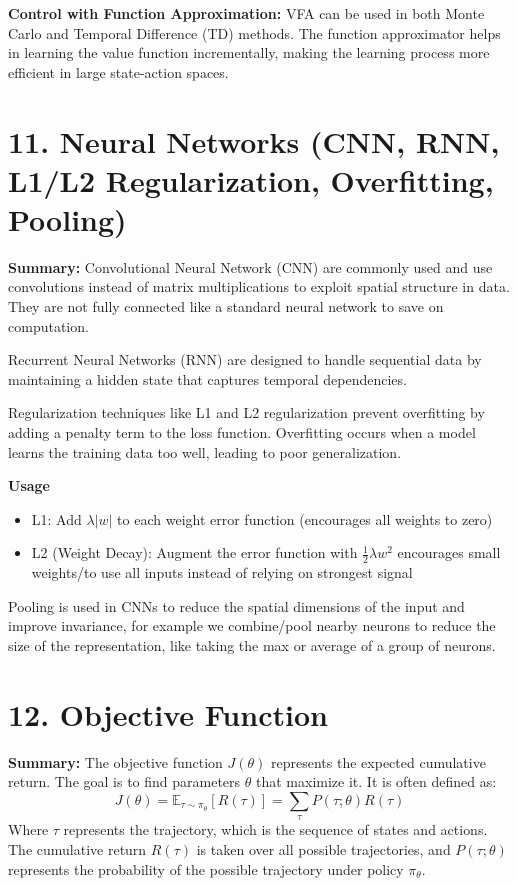 \documentclass[a4paper,10pt]{article}
\begin{document}
\begin{multicols}{2}
\noindent \textbf{Control with Function Approximation:} VFA can be used in both Monte Carlo and Temporal Difference (TD) methods. The function approximator helps in learning the value function incrementally, making the learning process more efficient in large state-action spaces.


\section*{11. Neural Networks (CNN, RNN, L1/L2 Regularization, Overfitting, Pooling)}
\textbf{Summary:} Convolutional Neural Network (CNN) are commonly used and use convolutions instead of matrix multiplications to exploit spatial structure in data. They are not fully connected like a standard neural network to save on computation.

Recurrent Neural Networks (RNN) are designed to handle sequential data by maintaining a hidden state that captures temporal dependencies.

Regularization techniques like L1 and L2 regularization prevent overfitting by adding a penalty term to the loss function. Overfitting occurs when a model learns the training data too well, leading to poor generalization.

\noindent \textbf{Usage}
\begin{itemize}
    \item L1: Add \( \lambda |w| \) to each weight error function (encourages all weights to zero)
    \item L2 (Weight Decay): Augment the error function with \( \frac{1}{2} \lambda w^2 \) encourages small weights/to use all inputs instead of relying on strongest signal
\end{itemize}
Pooling is used in CNNs to reduce the spatial dimensions of the input and improve invariance, for example we combine/pool nearby neurons to reduce the size of the representation, like taking the max or average of a group of neurons.

\section*{12. Objective Function}
\textbf{Summary:} The objective function \( J(\theta) \) represents the expected cumulative return. The goal is to find parameters \( \theta \) that maximize it. It is often defined as:
\[
J(\theta) = \mathbb{E}_{\tau \sim \pi_\theta} [R(\tau)] = \sum_{\tau} P(\tau;\theta)R(\tau)
\]
Where \( \tau \) represents the trajectory, which is the sequence of states and actions. The cumulative return \( R(\tau) \) is taken over all possible trajectories, and \( P(\tau;\theta) \) represents the probability of the possible trajectory under policy \( \pi_\theta \).


\end{multicols}
\end{document}
